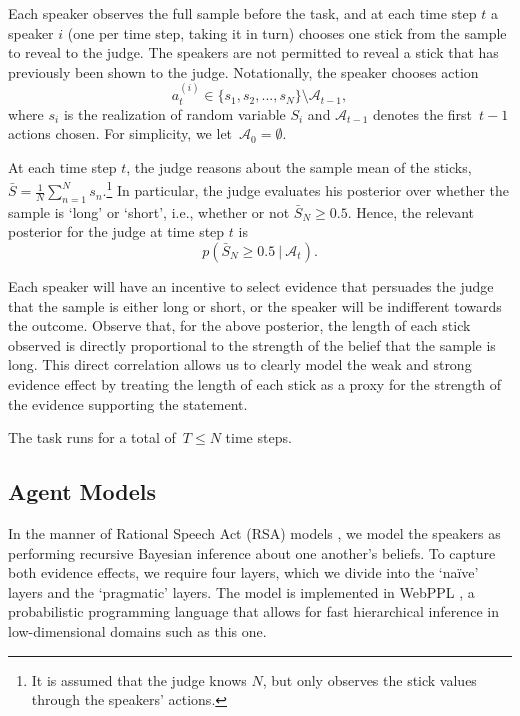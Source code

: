 \documentclass[10pt,letterpaper]{article}
\begin{document}
Each speaker observes the full sample before the task, and at each time step $t$ a speaker
$i$ (one per time step, taking it in turn) chooses one stick from the sample to reveal
to the judge. The speakers are not permitted to reveal a stick that has previously been shown to 
the judge. Notationally, the speaker chooses action 
\begin{equation}
a_t^{(i)} \in \{s_1, s_2, ..., s_N\} \setminus \mathcal{A}_{t-1},
\end{equation}
where $s_i$ is the realization of random variable $S_i$ and $\mathcal{A}_{t-1}$ denotes the first~${t-1}$ 
actions chosen. For simplicity, we let~${\mathcal{A}_0 = \emptyset}$.

At each time step $t$, the judge reasons about the sample mean of the sticks,~${\bar{S} = \frac{1}{N} \sum_{n=1}^N s_n}$.\footnote{It is assumed that the judge knows $N$, but only observes the stick values through the speakers' actions.}
In particular, the judge evaluates his posterior over whether the sample is `long' or `short', i.e., whether or not
$\bar{S	}_N \ge 0.5$. Hence, the relevant posterior for the judge at time step $t$ is
\begin{equation}
p( \bar{S}_N \ge 0.5 \ | \ \mathcal{A}_t ).
\end{equation}

Each speaker will have an incentive to select evidence that persuades the judge that the sample is
either long or short, or the speaker will be indifferent towards the outcome. Observe that, for the above posterior, 
the length of each stick observed is directly proportional to the strength of the belief that the sample is long.
This direct correlation allows us to clearly model the weak and strong evidence effect by treating the
length of each stick as a proxy for the strength of the evidence supporting the statement.

The task runs for a total of~${T\le N}$ time steps.

\subsection{Agent Models}
In the manner of Rational Speech Act (RSA) models \cite{goodman_pragmatic_2016}, we model the speakers as performing
recursive Bayesian inference about one another's beliefs. To capture both evidence effects,
we require four layers, which we divide into the `na\"ive' layers and the `pragmatic' layers.
The model is implemented in WebPPL \cite{dippl}, a probabilistic programming language that allows for
fast hierarchical inference in low-dimensional domains such as this one.
\end{document}
